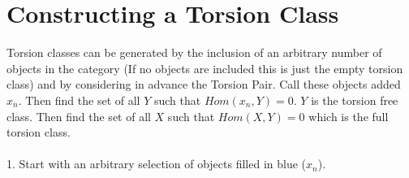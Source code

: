 \documentclass{article}
\begin{document}
\section{Constructing a Torsion Class}

Torsion classes can be generated by the inclusion of an arbitrary number of objects in the category (If no objects are included this is just the empty torsion class) and by considering in advance the Torsion Pair. Call these objects added $x_n$. Then find the set of all $Y$ such that $Hom(x_n, Y)=0$. $Y$ is the torsion free class. Then find the set of all $X$ such that $Hom(X,Y)=0$ which is the full torsion class. \\
\\
1. Start with an arbitrary selection of objects filled in blue ($x_n$).


\begin{center}
\end{center}
\end{document}
